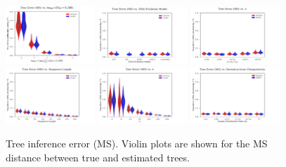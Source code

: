 \begin{figure} %
\centering
\includegraphics[width=0.3\textwidth]{figs/dualbirth-tree-ms-a}
\includegraphics[width=0.3\textwidth]{figs/dualbirth-tree-ms-b}
\includegraphics[width=0.3\textwidth]{figs/dualbirth-tree-ms-c}\\
\includegraphics[width=0.3\textwidth]{figs/dualbirth-tree-ms-d}
\includegraphics[width=0.3\textwidth]{figs/dualbirth-tree-ms-e}
\includegraphics[width=0.3\textwidth]{figs/dualbirth-tree-ms-f}
\caption[Tree inference error (MS)]
{Tree inference error (MS). Violin plots are shown for the MS distance between true and estimated trees.}
\label{fig:dualbirth-tree-ms}
\end{figure}

